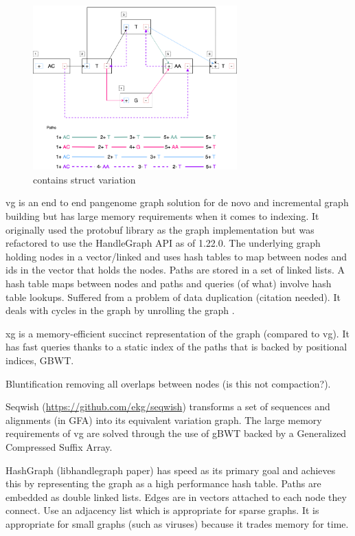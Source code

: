 \documentclass[11pt]{article}
\begin{document}
\begin{figure}[H]
\centering
\includegraphics[width=0.7\textwidth]{figures/Variation Graph-Page-2.png} 
\caption{contains struct variation}\label{contains struct}
\end{figure}

vg \cite{garrisonVariationGraphToolkit2018} is an end to end pangenome graph
solution for de novo and incremental graph building but has large memory
requirements when it comes to indexing.
It originally used the protobuf library as the graph implementation but was
refactored to use the HandleGraph API as of 1.22.0.
The underlying graph holding nodes in a vector/linked and uses hash tables to
 map between nodes and ids in the vector that holds the nodes.
Paths are stored in a set of linked lists. 
A hash table maps between nodes and paths and queries (of what) involve hash
table lookups.
Suffered from a problem of data duplication (citation needed).
It deals with cycles in the graph by unrolling the graph
\cite{liDesignConstructionReference2020}.

xg \cite{garrisonGraphicalPangenomics2019} is a memory-efficient succinct
representation of the graph (compared to vg). 
It has fast queries thanks to a static index of the paths that is backed by
positional indices, GBWT.

Bluntification \cite{gargGraphbasedApproachDiploid2018} removing all overlaps 
between nodes (is this not compaction?).

Seqwish (\url{https://github.com/ekg/seqwish}) transforms a set of 
sequences and alignments (in GFA) into its equivalent variation graph.
The large memory requirements of vg are solved through the use of gBWT backed
by a Generalized Compressed Suffix Array.

HashGraph (libhandlegraph paper) has speed as its primary goal and achieves this 
by representing the graph as a high performance hash table. 
Paths are embedded as double linked lists.
Edges are in vectors attached to each node they connect.
Use an adjacency list which is appropriate for sparse graphs. 
It is appropriate for small graphs (such as viruses) because it trades memory
for time.
\end{document}
